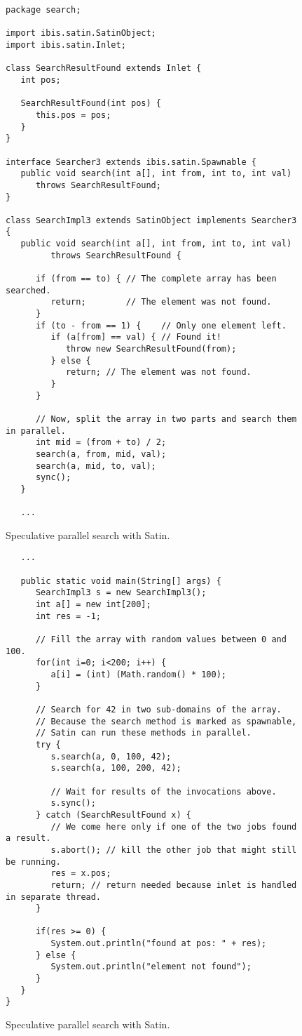 \documentclass[10pt]{article}
\begin{document}
\begin{figure}[t!]
{\small
\begin{verbatim}
package search;

import ibis.satin.SatinObject;
import ibis.satin.Inlet;

class SearchResultFound extends Inlet {
   int pos;

   SearchResultFound(int pos) {
      this.pos = pos;
   }
}

interface Searcher3 extends ibis.satin.Spawnable {
   public void search(int a[], int from, int to, int val)
      throws SearchResultFound;
}

class SearchImpl3 extends SatinObject implements Searcher3 {
   public void search(int a[], int from, int to, int val)
         throws SearchResultFound {

      if (from == to) { // The complete array has been searched.
         return;        // The element was not found.
      }
      if (to - from == 1) {    // Only one element left.
         if (a[from] == val) { // Found it!
            throw new SearchResultFound(from);
         } else {
            return; // The element was not found.
         }
      }

      // Now, split the array in two parts and search them in parallel.
      int mid = (from + to) / 2;
      search(a, from, mid, val);
      search(a, mid, to, val);
      sync();
   }

   ...
\end{verbatim}
}
\caption{Speculative parallel search with Satin.}
\label{satin-spec-search-fig1}
\end{figure}

\begin{figure}[t!]
{\small
\begin{verbatim}
   ...

   public static void main(String[] args) {
      SearchImpl3 s = new SearchImpl3();
      int a[] = new int[200];
      int res = -1;

      // Fill the array with random values between 0 and 100.
      for(int i=0; i<200; i++) {
         a[i] = (int) (Math.random() * 100);
      }

      // Search for 42 in two sub-domains of the array.
      // Because the search method is marked as spawnable,
      // Satin can run these methods in parallel.
      try {
         s.search(a, 0, 100, 42);
         s.search(a, 100, 200, 42);

         // Wait for results of the invocations above.
         s.sync();
      } catch (SearchResultFound x) {
         // We come here only if one of the two jobs found a result.
         s.abort(); // kill the other job that might still be running.
         res = x.pos;
         return; // return needed because inlet is handled in separate thread.
      }

      if(res >= 0) {
         System.out.println("found at pos: " + res);
      } else {
         System.out.println("element not found");
      }
   }
}
\end{verbatim}
}
\caption{Speculative parallel search with Satin.}
\label{satin-spec-search-fig2}
\end{figure}
\end{document}
